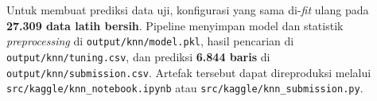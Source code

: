 Untuk membuat prediksi data uji, konfigurasi yang sama di-\textit{fit} ulang pada \textbf{27.309 data latih bersih}. Pipeline menyimpan model dan statistik \textit{preprocessing} di \nolinkurl{output/knn/model.pkl}, hasil pencarian di \nolinkurl{output/knn/tuning.csv}, dan prediksi \textbf{6.844 baris} di \nolinkurl{output/knn/submission.csv}. Artefak tersebut dapat direproduksi melalui \nolinkurl{src/kaggle/knn_notebook.ipynb} atau \nolinkurl{src/kaggle/knn_submission.py}.